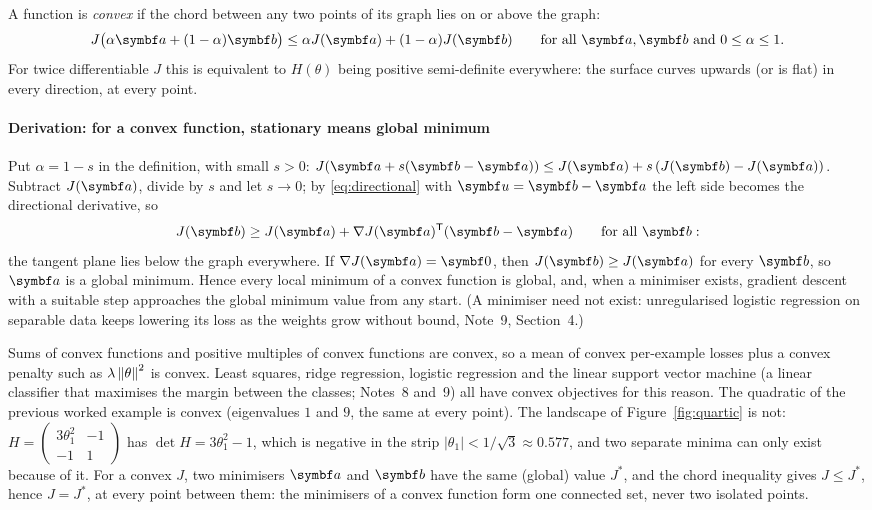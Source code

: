 \documentclass[11pt]{article}
\newcommand{\uvec}{\vect{u}}
\begin{document}
A function is \emph{convex} if the chord between any two points of its graph lies on or above the graph:
\[
  J\big(\alpha\vect{a} + (1 - \alpha)\vect{b}\big) \le \alpha J(\vect{a}) + (1 - \alpha) J(\vect{b})
  \qquad\text{for all } \vect{a}, \vect{b} \text{ and } 0 \le \alpha \le 1 .
\]
For twice differentiable $J$ this is equivalent to $H(\theta)$ being positive semi-definite everywhere: the surface
curves upwards (or is flat) in every direction, at every point.

\paragraph{Derivation: for a convex function, stationary means global minimum} Put $\alpha = 1 - s$ in the
definition, with small $s > 0$: $J(\vect{a} + s(\vect{b} - \vect{a})) \le J(\vect{a}) + s\,(J(\vect{b}) - J(\vect{a}))$.
Subtract $J(\vect{a})$, divide by $s$ and let $s \to 0$; by \eqref{eq:directional} with $\uvec = \vect{b} - \vect{a}$
the left side becomes the directional derivative, so
\[
  J(\vect{b}) \ge J(\vect{a}) + \nabla J(\vect{a})\T(\vect{b} - \vect{a}) \qquad\text{for all } \vect{b} :
\]
the tangent plane lies below the graph everywhere. If $\nabla J(\vect{a}) = \vect{0}$, then $J(\vect{b}) \ge J(\vect{a})$
for every $\vect{b}$, so $\vect{a}$ is a global minimum. Hence every local minimum of a convex function is global, and,
when a minimiser exists, gradient descent with a suitable step approaches the global minimum value from any start. (A
minimiser need not exist: unregularised logistic regression on separable data keeps lowering its loss as the weights
grow without bound, Note~9, Section~4.)

Sums of convex functions and positive multiples of convex functions are convex, so a mean of convex per-example losses
plus a convex penalty such as $\lambda\left\lVert \theta \right\rVert^2$ is convex. Least squares, ridge regression, logistic regression
and the linear support vector machine (a linear classifier that maximises the margin between the classes; Notes~8
and~9) all have convex objectives for this reason. The quadratic of the
previous worked example is convex (eigenvalues $1$ and $9$, the same at every point). The landscape of
Figure~\ref{fig:quartic} is not: $H = \begin{pmatrix} 3\theta_1^2 & -1 \\ -1 & 1\end{pmatrix}$ has
$\det H = 3\theta_1^2 - 1$, which is negative in the strip $|\theta_1| < 1/\sqrt3 \approx 0.577$, and two separate
minima can only exist because of it. For a convex $J$, two minimisers $\vect{a}$ and $\vect{b}$ have the same (global)
value $J^*$, and the chord inequality gives $J \le J^*$, hence $J = J^*$, at every point between them: the minimisers
of a convex function form one connected set, never two isolated points.
\end{document}
